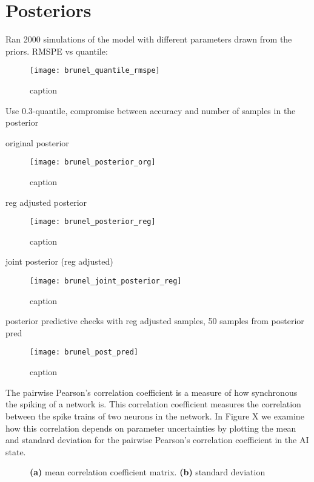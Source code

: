 \section{Posteriors} 

Ran 2000 simulations of the model with different parameters drawn from the priors. RMSPE vs quantile: 

\begin{figure}[H]
    \centering
    \texttt{[image: brunel\_quantile\_rmspe]}
    \caption{caption}
    \label{fig:fig1}
\end{figure}

Use 0.3-quantile, compromise between accuracy and number of samples in the posterior

original posterior

\begin{figure}[H]
    \centering
    \texttt{[image: brunel\_posterior\_org]}
    \caption{caption}
    \label{fig:fig1}
\end{figure}

reg adjusted posterior

\begin{figure}[H]
    \centering
    \texttt{[image: brunel\_posterior\_reg]}
    \caption{caption}
    \label{fig:fig1}
\end{figure}


joint posterior (reg adjusted)

\begin{figure}[H]
    \centering
    \texttt{[image: brunel\_joint\_posterior\_reg]}
    \caption{caption}
    \label{fig:fig1}
\end{figure}

posterior predictive checks with reg adjusted samples, 50 samples from posterior pred

\begin{figure}[H]
    \centering
    \texttt{[image: brunel\_post\_pred]}
    \caption{caption}
    \label{fig:fig1}
\end{figure}

The pairwise Pearson's correlation coefficient is a measure of how synchronous the spiking of a network is. This correlation coefficient measures the correlation between the spike trains of two neurons in the network. In Figure X we examine how this correlation depends on parameter uncertainties by plotting the mean and standard deviation for the pairwise Pearson's correlation coefficient in the AI state.

\begin{figure}[H]
\centering
{}
\qquad
{}
\caption{\textbf{(a)} mean correlation coefficient matrix. \textbf{(b)} standard deviation
}
\label{fig:fig1}
\end{figure}



